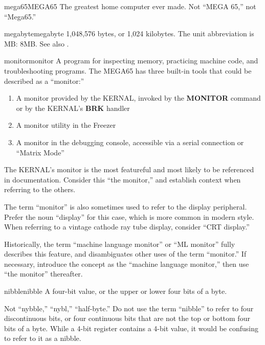 \begin{sgentry}{mega65}{MEGA65}
    The greatest home computer ever made. Not ``MEGA 65,'' not ``Mega65.''
\end{sgentry}

\begin{sgentry}{megabyte}{megabyte}
    1,048,576 bytes, or 1,024 kilobytes. The unit abbreviation is MB: 8MB. See also .
\end{sgentry}

\begin{sgentry}{monitor}{monitor}
    A program for inspecting memory, practicing machine code, and troubleshooting programs. The MEGA65 has three built-in tools that could be described as a ``monitor:''

    \begin{enumerate}
        \item A monitor provided by the KERNAL, invoked by the \textbf{MONITOR} command or by the KERNAL's \textbf{BRK} handler
        \item A monitor utility in the Freezer
        \item A monitor in the debugging console, accessible via a serial connection or ``Matrix Mode''
    \end{enumerate}

    The KERNAL's monitor is the most featureful and most likely to be referenced in documentation. Consider this ``the monitor,'' and establish context when referring to the others.

    The term ``monitor'' is also sometimes used to refer to the display peripheral. Prefer the noun ``display'' for this case, which is more common in modern style. When referring to a vintage cathode ray tube display, consider ``CRT display.''

    Historically, the term ``machine language monitor'' or ``ML monitor'' fully describes this feature, and disambiguates other uses of the term ``monitor.'' If necessary, introduce the concept as the ``machine language monitor,'' then use ``the monitor'' thereafter.
\end{sgentry}

\begin{sgentry}{nibble}{nibble}
    A four-bit value, or the upper or lower four bits of a byte.

    Not ``nybble,'' ``nybl,'' ``half-byte.'' Do not use the term ``nibble'' to refer to four discontinuous bits, or four continuous bits that are not the top or bottom four bits of a byte. While a 4-bit register contains a 4-bit value, it would be confusing to refer to it as a nibble.
\end{sgentry}

